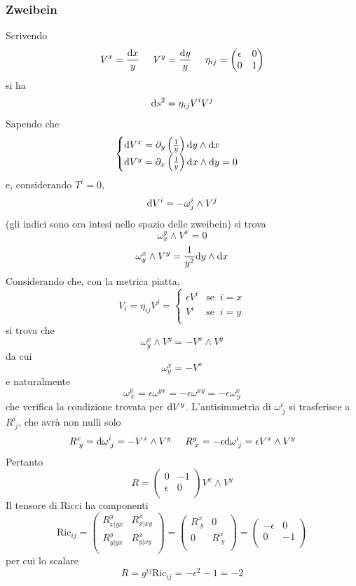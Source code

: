 \subsubsection*{Zweibein}
Scrivendo
\[ V^x = \frac{\mathrm{d} x}{y} \;\;\;\;\; V^y = \frac{\mathrm{d} y}{y} \;\;\;\;\; \eta_{ij} = 
	\begin{pmatrix}
		\epsilon & 0 \\
		0        & 1 \\
	\end{pmatrix}
\]
si ha
\[ \mathrm{d} s^2 = \eta_{ij} V^iV^j \]
\newline
Sapendo che 
\[ 	\begin{cases}
	\mathrm{d} V^x = \partial_y \left(\frac{1}{y}\right) \mathrm{d} y \wedge \mathrm{d} x & \\
	\mathrm{d} V^y = \partial_x \left(\frac{1}{y}\right) \mathrm{d} x \wedge \mathrm{d} y = 0  & \\
	\end{cases}
\]
e, considerando \(T^i = 0\), 
\[ \mathrm{d} V^i = -\omega^i_j\wedge V^j \]
(gli indici sono ora intesi nello spazio delle zweibein)
si trova
\[ \omega^y_x \wedge V^x = 0 \]
\[ \omega^x_y \wedge V^y = \frac{1}{y^2} \mathrm{d} y \wedge \mathrm{d} x \]
Considerando che, con la metrica piatta,
\[ V_i = \eta_{ij} V^j = \begin{cases}
	\epsilon V^i & \mathrm{se} \;\; i=x \\
	V^i	     & \mathrm{se} \;\; i=y \\
\end{cases} \]
si trova che 
\[ \omega^x_y \wedge V^y = -V^x\wedge V^y \]
da cui 
\[ \omega^x_y = -V^x \]
e naturalmente
\[ \omega^y_{\,x}= \epsilon\omega^{yx} = -\epsilon\omega^{xy} = -\epsilon\omega^x_{\,y} \]
che verifica la condizione trovata per $\mathrm{d} V^y$.
L'antisimmetria di $\omega^i_{\;j}$ si trasferisce a $R^i_{\;j}$, che avr\`a non nulli solo
\[ R^x_{\;y} = \mathrm{d} \omega^i_{\;j} = -V^x\wedge V^y \;\;\;\;\; R^y_{\;x} = -\epsilon\mathrm{d} \omega^i_{\;j} = \epsilon V^x\wedge V^y \]
Pertanto 
\[ R = \begin{pmatrix}
		0 & -1 \\
		\epsilon & 0 \\
	\end{pmatrix} V^x \wedge V^y \]
Il tensore di Ricci ha componenti
\[ \mathrm{Ric}_{ij} = 
	\begin{pmatrix}
		R^y_{x|yx} & R^x_{x|xy} \\
		R^y_{y|yx} & R^x_{y|xy} \\
	\end{pmatrix}
	= \begin{pmatrix}
		R^x_{\;y} & 0 \\
		0 & R^x_{\;y} \\
	\end{pmatrix}
	= \begin{pmatrix}
		-\epsilon & 0 \\
		0 & -1 \\
	\end{pmatrix}
\]
per cui lo scalare 
\[ R = g^{ij} \mathrm{Ric}_{ij} = -\epsilon^2 -1=-2 \]


